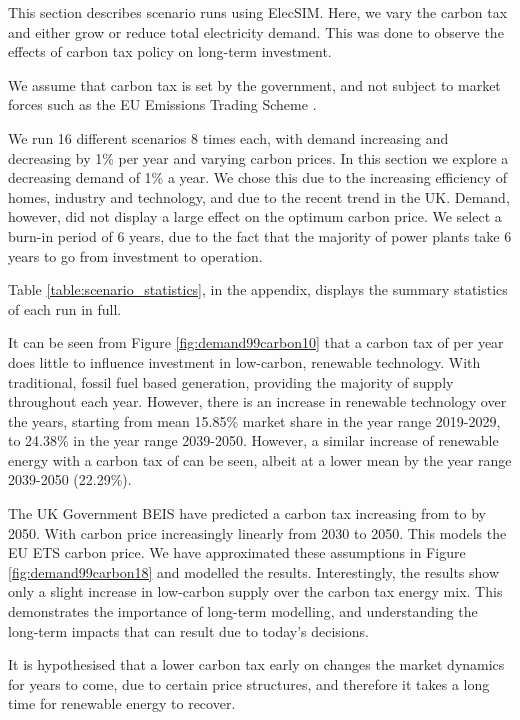 
This section describes scenario runs using ElecSIM. Here, we vary the carbon tax and either grow or reduce total electricity demand. This was done to observe the effects of carbon tax policy on long-term investment.

We assume that carbon tax is set by the government, and not subject to market forces such as the EU Emissions Trading Scheme \cite{Council2016}.

We run 16 different scenarios 8 times each, with demand increasing and decreasing by 1\% per year and  varying carbon prices. In this section we explore a decreasing demand of 1\% a year. We chose this due to the increasing efficiency of homes, industry and technology, and due to the recent trend in the UK. Demand, however, did not display a large effect on the optimum carbon price. We select a burn-in period of 6 years, due to the fact that the majority of power plants take 6 years to go from investment to operation.

Table \ref{table:scenario_statistics}, in the appendix, displays the summary statistics of each run in full.

It can be seen from Figure \ref{fig:demand99carbon10} that a carbon tax of  per year does little to influence investment in low-carbon, renewable technology. With traditional, fossil fuel based generation, providing the majority of supply throughout each year. However, there is an increase in renewable technology over the years, starting from mean 15.85\% market share in the year range 2019-2029, to 24.38\% in the year range 2039-2050. However, a similar increase of renewable energy with a carbon tax of  can be seen, albeit at a lower mean by the year range 2039-2050 (22.29\%).

The UK Government BEIS have predicted a carbon tax increasing from  to  by 2050. With carbon price increasingly linearly from 2030 to 2050. This models the EU ETS carbon price. We have approximated these assumptions in Figure \ref{fig:demand99carbon18} and modelled the results. Interestingly, the results show only a slight increase in low-carbon supply over the  carbon tax energy mix. This demonstrates the importance of long-term modelling, and understanding the long-term impacts that can result due to today's decisions.

It is hypothesised that a lower carbon tax early on changes the market dynamics for years to come, due to certain price structures, and therefore it takes a long time for renewable energy to recover.

